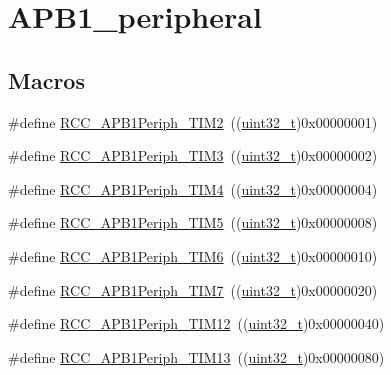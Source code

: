 \hypertarget{group___a_p_b1__peripheral}{}\section{A\+P\+B1\+\_\+peripheral}
\label{group___a_p_b1__peripheral}
\subsection*{Macros}
\begin{DoxyCompactItemize}
\item 
\#define \hyperlink{group___a_p_b1__peripheral_ga742bab2f04cebe587574b53f7107aeaf}{R\+C\+C\+\_\+\+A\+P\+B1\+Periph\+\_\+\+T\+I\+M2}~((\hyperlink{_p_e___types_8h_a33594304e786b158f3fb30289278f5af}{uint32\+\_\+t})0x00000001)
\item 
\#define \hyperlink{group___a_p_b1__peripheral_gad4454f63a511a256e55aad55c03beb76}{R\+C\+C\+\_\+\+A\+P\+B1\+Periph\+\_\+\+T\+I\+M3}~((\hyperlink{_p_e___types_8h_a33594304e786b158f3fb30289278f5af}{uint32\+\_\+t})0x00000002)
\item 
\#define \hyperlink{group___a_p_b1__peripheral_ga80f9f3720804a97210b723696bd94d83}{R\+C\+C\+\_\+\+A\+P\+B1\+Periph\+\_\+\+T\+I\+M4}~((\hyperlink{_p_e___types_8h_a33594304e786b158f3fb30289278f5af}{uint32\+\_\+t})0x00000004)
\item 
\#define \hyperlink{group___a_p_b1__peripheral_ga4905c26000a571fa01fc057fe31d254a}{R\+C\+C\+\_\+\+A\+P\+B1\+Periph\+\_\+\+T\+I\+M5}~((\hyperlink{_p_e___types_8h_a33594304e786b158f3fb30289278f5af}{uint32\+\_\+t})0x00000008)
\item 
\#define \hyperlink{group___a_p_b1__peripheral_ga4974e8b8f11d54fbc0bac1988ff6254c}{R\+C\+C\+\_\+\+A\+P\+B1\+Periph\+\_\+\+T\+I\+M6}~((\hyperlink{_p_e___types_8h_a33594304e786b158f3fb30289278f5af}{uint32\+\_\+t})0x00000010)
\item 
\#define \hyperlink{group___a_p_b1__peripheral_ga9415b0c46db5318bdee3f868c16b8d35}{R\+C\+C\+\_\+\+A\+P\+B1\+Periph\+\_\+\+T\+I\+M7}~((\hyperlink{_p_e___types_8h_a33594304e786b158f3fb30289278f5af}{uint32\+\_\+t})0x00000020)
\item 
\#define \hyperlink{group___a_p_b1__peripheral_ga0a4ec40233160ca20adaa571073e7bcd}{R\+C\+C\+\_\+\+A\+P\+B1\+Periph\+\_\+\+T\+I\+M12}~((\hyperlink{_p_e___types_8h_a33594304e786b158f3fb30289278f5af}{uint32\+\_\+t})0x00000040)
\item 
\#define \hyperlink{group___a_p_b1__peripheral_ga34397b722f46f31e898136fb51a7523a}{R\+C\+C\+\_\+\+A\+P\+B1\+Periph\+\_\+\+T\+I\+M13}~((\hyperlink{_p_e___types_8h_a33594304e786b158f3fb30289278f5af}{uint32\+\_\+t})0x00000080)

\end{DoxyCompactItemize}
